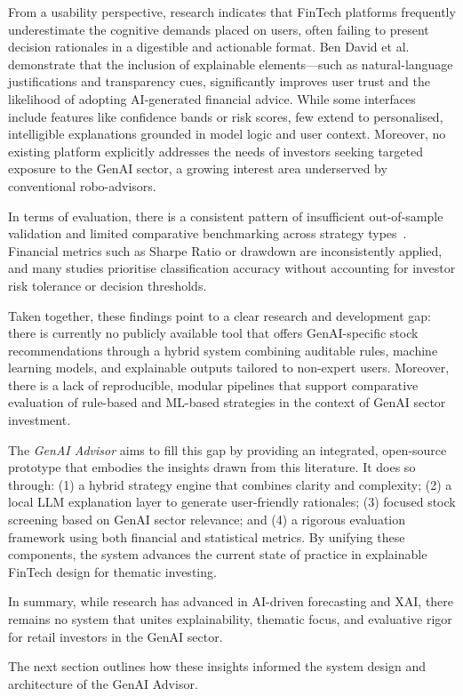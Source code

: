 From a usability perspective, research indicates that FinTech platforms frequently underestimate the cognitive demands placed on users, often failing to present decision rationales in a digestible and actionable format. Ben David et al.~\cite{bendavid2021explainable} demonstrate that the inclusion of explainable elements—such as natural-language justifications and transparency cues, significantly improves user trust and the likelihood of adopting AI-generated financial advice. While some interfaces include features like confidence bands or risk scores, few extend to personalised, intelligible explanations grounded in model logic and user context. Moreover, no existing platform explicitly addresses the needs of investors seeking targeted exposure to the GenAI sector, a growing interest area underserved by conventional robo-advisors.

In terms of evaluation, there is a consistent pattern of insufficient out-of-sample validation and limited comparative benchmarking across strategy types~\cite{bailey2014backtest, kaastra1996forecasting}. Financial metrics such as Sharpe Ratio or drawdown are inconsistently applied, and many studies prioritise classification accuracy without accounting for investor risk tolerance or decision thresholds.

Taken together, these findings point to a clear research and development gap: there is currently no publicly available tool that offers GenAI-specific stock recommendations through a hybrid system combining auditable rules, machine learning models, and explainable outputs tailored to non-expert users. Moreover, there is a lack of reproducible, modular pipelines that support comparative evaluation of rule-based and ML-based strategies in the context of GenAI sector investment.

The \textit{GenAI Advisor} aims to fill this gap by providing an integrated, open-source prototype that embodies the insights drawn from this literature. It does so through: (1) a hybrid strategy engine that combines clarity and complexity; (2) a local LLM explanation layer to generate user-friendly rationales; (3) focused stock screening based on GenAI sector relevance; and (4) a rigorous evaluation framework using both financial and statistical metrics. By unifying these components, the system advances the current state of practice in explainable FinTech design for thematic investing.

In summary, while research has advanced in AI-driven forecasting and XAI, there remains no system that unites explainability, thematic focus, and evaluative rigor for retail investors in the GenAI sector.

The next section outlines how these insights informed the system design and architecture of the GenAI Advisor.